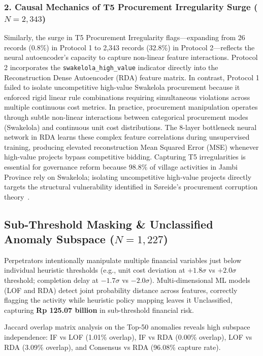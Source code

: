 \documentclass[runningheads]{llncs}
\begin{document}
\subsubsection{2. Causal Mechanics of T5 Procurement Irregularity Surge ($N=2,343$)}
Similarly, the surge in T5 Procurement Irregularity flags---expanding from 26 records (0.8\%) in Protocol 1 to 2,343 records (32.8\%) in Protocol 2---reflects the neural autoencoder's capacity to capture non-linear feature interactions. Protocol 2 incorporates the \texttt{swakelola\_high\_value} indicator directly into the Reconstruction Dense Autoencoder (RDA) feature matrix. In contrast, Protocol 1 failed to isolate uncompetitive high-value Swakelola procurement because it enforced rigid linear rule combinations requiring simultaneous violations across multiple continuous cost metrics. In practice, procurement manipulation operates through subtle non-linear interactions between categorical procurement modes (Swakelola) and continuous unit cost distributions. The 8-layer bottleneck neural network in RDA learns these complex feature correlations during unsupervised training, producing elevated reconstruction Mean Squared Error (MSE) whenever high-value projects bypass competitive bidding. Capturing T5 irregularities is essential for governance reform because 98.8\% of village activities in Jambi Province rely on Swakelola; isolating uncompetitive high-value projects directly targets the structural vulnerability identified in S{\o}reide's procurement corruption theory~\cite{ref9}.

\subsection{Sub-Threshold Masking \& Unclassified Anomaly Subspace ($N=1,227$)}
Perpetrators intentionally manipulate multiple financial variables just below individual heuristic thresholds (e.g., unit cost deviation at $+1.8\sigma$ vs $+2.0\sigma$ threshold; completion delay at $-1.7\sigma$ vs $-2.0\sigma$). Multi-dimensional ML models (LOF and RDA) detect joint probability distance across features, correctly flagging the activity while heuristic policy mapping leaves it Unclassified, capturing \textbf{Rp 125.07 billion} in sub-threshold financial risk.

Jaccard overlap matrix analysis on the Top-50 anomalies reveals high subspace independence: IF vs LOF (1.01\% overlap), IF vs RDA (0.00\% overlap), LOF vs RDA (3.09\% overlap), and Consensus vs RDA (96.08\% capture rate).
\end{document}
